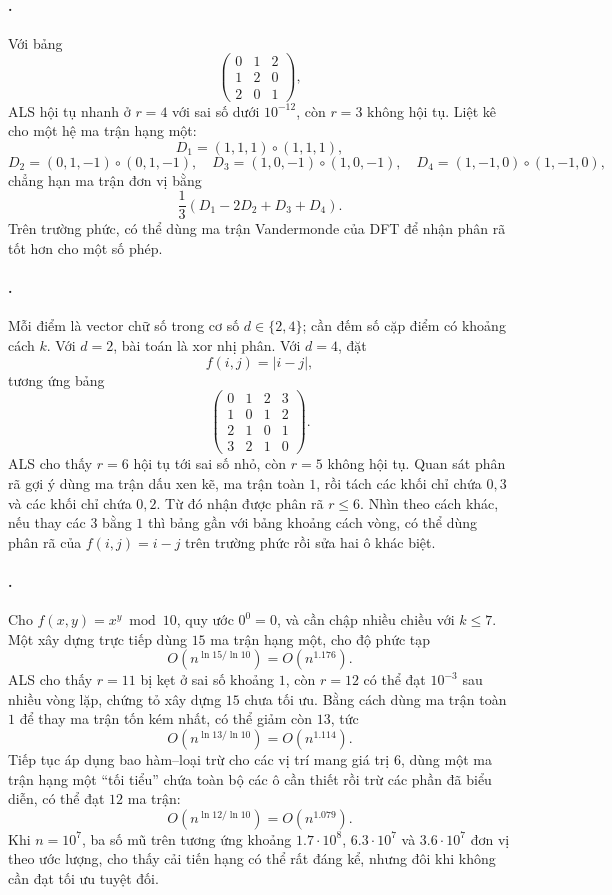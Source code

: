 \documentclass[11pt]{article}
\begin{document}
\paragraph{.}
Với bảng
\[
  \begin{pmatrix}
    0&1&2\\
    1&2&0\\
    2&0&1
  \end{pmatrix},
\]
ALS hội tụ nhanh ở \(r=4\) với sai số dưới \(10^{-12}\), còn \(r=3\) không hội
tụ. Liệt kê cho một hệ ma trận hạng một:
\[
  D_1=(1,1,1)\circ(1,1,1),
\]
\[
  D_2=(0,1,-1)\circ(0,1,-1),\quad
  D_3=(1,0,-1)\circ(1,0,-1),\quad
  D_4=(1,-1,0)\circ(1,-1,0),
\]
chẳng hạn ma trận đơn vị bằng
\[
  \frac{1}{3}(D_1-2D_2+D_3+D_4).
\]
Trên trường phức, có thể dùng ma trận Vandermonde của DFT để nhận phân rã tốt
hơn cho một số phép.

\paragraph{.}
Mỗi điểm là vector chữ số trong cơ số \(d\in\{2,4\}\); cần đếm số cặp điểm có
khoảng cách \(k\). Với \(d=2\), bài toán là xor nhị phân. Với \(d=4\), đặt
\[
  f(i,j)=|i-j|,
\]
tương ứng bảng
\[
  \begin{pmatrix}
    0&1&2&3\\
    1&0&1&2\\
    2&1&0&1\\
    3&2&1&0
  \end{pmatrix}.
\]
ALS cho thấy \(r=6\) hội tụ tới sai số nhỏ, còn \(r=5\) không hội tụ. Quan sát
phân rã gợi ý dùng ma trận dấu xen kẽ, ma trận toàn \(1\), rồi tách các khối
chỉ chứa \(0,3\) và các khối chỉ chứa \(0,2\). Từ đó nhận được phân rã
\(r\le 6\). Nhìn theo cách khác, nếu thay các \(3\) bằng \(1\) thì bảng gần
với bảng khoảng cách vòng, có thể dùng phân rã của \(f(i,j)=i-j\) trên trường
phức rồi sửa hai ô khác biệt.

\paragraph{.}
Cho \(f(x,y)=x^y\bmod 10\), quy ước \(0^0=0\), và cần chập nhiều chiều với
\(k\le 7\). Một xây dựng trực tiếp dùng \(15\) ma trận hạng một, cho độ phức
tạp
\[
  O(n^{\ln 15/\ln 10})=O(n^{1.176}).
\]
ALS cho thấy \(r=11\) bị kẹt ở sai số khoảng \(1\), còn \(r=12\) có thể đạt
\(10^{-3}\) sau nhiều vòng lặp, chứng tỏ xây dựng \(15\) chưa tối ưu. Bằng
cách dùng ma trận toàn \(1\) để thay ma trận tốn kém nhất, có thể giảm còn
\(13\), tức
\[
  O(n^{\ln 13/\ln 10})=O(n^{1.114}).
\]
Tiếp tục áp dụng bao hàm--loại trừ cho các vị trí mang giá trị \(6\), dùng một
ma trận hạng một ``tối tiểu'' chứa toàn bộ các ô cần thiết rồi trừ các phần đã
biểu diễn, có thể đạt \(12\) ma trận:
\[
  O(n^{\ln 12/\ln 10})=O(n^{1.079}).
\]
Khi \(n=10^7\), ba số mũ trên tương ứng khoảng \(1.7\cdot 10^8\),
\(6.3\cdot 10^7\) và \(3.6\cdot 10^7\) đơn vị theo ước lượng, cho thấy cải
tiến hạng có thể rất đáng kể, nhưng đôi khi không cần đạt tối ưu tuyệt đối.
\end{document}

